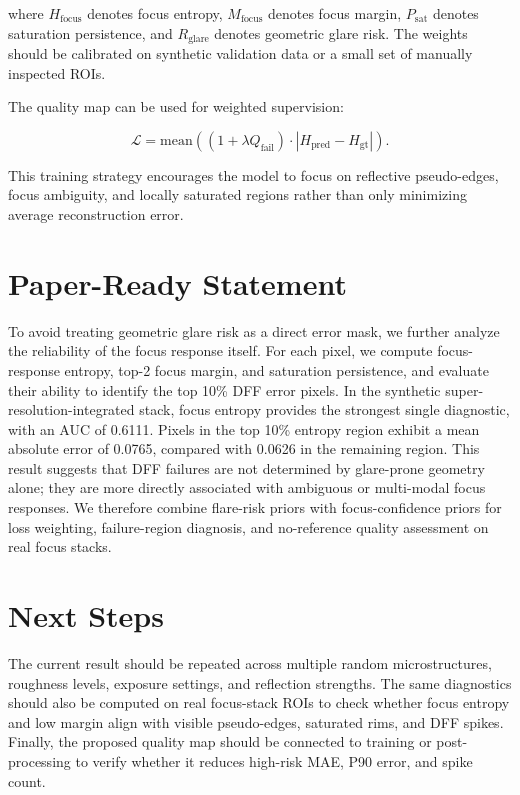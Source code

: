 \documentclass[11pt]{article}
\begin{document}
where $H_{\mathrm{focus}}$ denotes focus entropy, $M_{\mathrm{focus}}$ denotes focus margin, $P_{\mathrm{sat}}$ denotes saturation persistence, and $R_{\mathrm{glare}}$ denotes geometric glare risk. The weights should be calibrated on synthetic validation data or a small set of manually inspected ROIs.

The quality map can be used for weighted supervision:

\begin{equation}
\mathcal{L} =
\mathrm{mean}\left((1 + \lambda Q_{\mathrm{fail}}) \cdot
\left|H_{\mathrm{pred}} - H_{\mathrm{gt}}\right|\right).
\end{equation}

This training strategy encourages the model to focus on reflective pseudo-edges, focus ambiguity, and locally saturated regions rather than only minimizing average reconstruction error.

\section{Paper-Ready Statement}

To avoid treating geometric glare risk as a direct error mask, we further analyze the reliability of the focus response itself. For each pixel, we compute focus-response entropy, top-2 focus margin, and saturation persistence, and evaluate their ability to identify the top 10\% DFF error pixels. In the synthetic super-resolution-integrated stack, focus entropy provides the strongest single diagnostic, with an AUC of 0.6111. Pixels in the top 10\% entropy region exhibit a mean absolute error of 0.0765, compared with 0.0626 in the remaining region. This result suggests that DFF failures are not determined by glare-prone geometry alone; they are more directly associated with ambiguous or multi-modal focus responses. We therefore combine flare-risk priors with focus-confidence priors for loss weighting, failure-region diagnosis, and no-reference quality assessment on real focus stacks.

\section{Next Steps}

The current result should be repeated across multiple random microstructures, roughness levels, exposure settings, and reflection strengths. The same diagnostics should also be computed on real focus-stack ROIs to check whether focus entropy and low margin align with visible pseudo-edges, saturated rims, and DFF spikes. Finally, the proposed quality map should be connected to training or post-processing to verify whether it reduces high-risk MAE, P90 error, and spike count.
\end{document}
